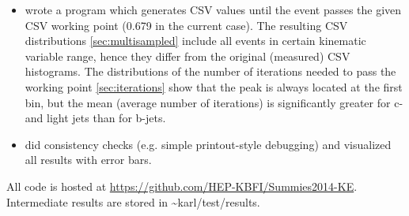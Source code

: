 \documentclass[12pt,a4paper]{article}
\begin{document}
\begin{itemize}
Judging by the numbers \ref{sec:tests} it would seem that CSV distribution for high energy b- and c-jets arent't compatible.
Simple sanity check
\footnote{The difference between two histograms was plotted and further divided (scaled) by the number of events.}
shows that the incompatibility isn't that bad -- the discrepancy is at most 0.5\% per bin.
The closure holds in general. 
\item wrote a program which generates CSV values until the event passes the given CSV working point (0.679 in the current case).
The resulting CSV distributions \ref{sec:multisampled} include all events in certain kinematic variable range, hence they differ from the original (measured) CSV histograms.
The distributions of the number of iterations needed to pass the working point \ref{sec:iterations} show that the peak is always located at the first bin, but the mean (average number of iterations) is significantly greater for c- and light jets than for b-jets.
\item did consistency checks (e.g. simple printout-style debugging) and visualized all results with error bars.
\end{itemize}

All code is hosted at \href{https://github.com/HEP-KBFI/Summies2014-KE}{https://github.com/HEP-KBFI/Summies2014-KE}.
Intermediate results are stored in {\textasciitilde}karl/test/results.

\newpage
\end{document}
